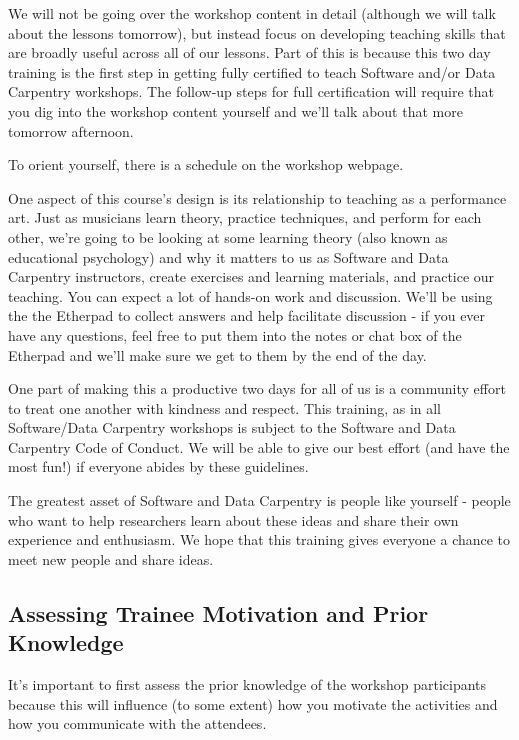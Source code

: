 We will not be going over the workshop content in detail (although we
will talk about the lessons tomorrow), but instead focus on developing
teaching skills that are broadly useful across all of our lessons. Part
of this is because this two day training is the first step in getting
fully certified to teach Software and/or Data Carpentry workshops. The
follow-up steps for full certification will require that you dig into
the workshop content yourself and we'll talk about that more tomorrow
afternoon.

To orient yourself, there is a schedule on the workshop webpage.

One aspect of this course's design is its relationship to teaching as a
performance art. Just as musicians learn theory, practice techniques,
and perform for each other, we're going to be looking at some learning
theory (also known as educational psychology) and why it matters to us
as Software and Data Carpentry instructors, create exercises and
learning materials, and practice our teaching. You can expect a lot of
hands-on work and discussion. We'll be using the the Etherpad to collect
answers and help facilitate discussion - if you ever have any questions,
feel free to put them into the notes or chat box of the Etherpad and
we'll make sure we get to them by the end of the day.

One part of making this a productive two days for all of us is a
community effort to treat one another with kindness and respect. This
training, as in all Software/Data Carpentry workshops is subject to the
Software and Data Carpentry Code of Conduct. We will be able to give our
best effort (and have the most fun!) if everyone abides by these
guidelines.

The greatest asset of Software and Data Carpentry is people like
yourself - people who want to help researchers learn about these ideas
and share their own experience and enthusiasm. We hope that this
training gives everyone a chance to meet new people and share ideas.

\subsection{Assessing Trainee Motivation and Prior
Knowledge}\label{assessing-trainee-motivation-and-prior-knowledge}

It's important to first assess the prior knowledge of the workshop
participants because this will influence (to some extent) how you
motivate the activities and how you communicate with the attendees.

